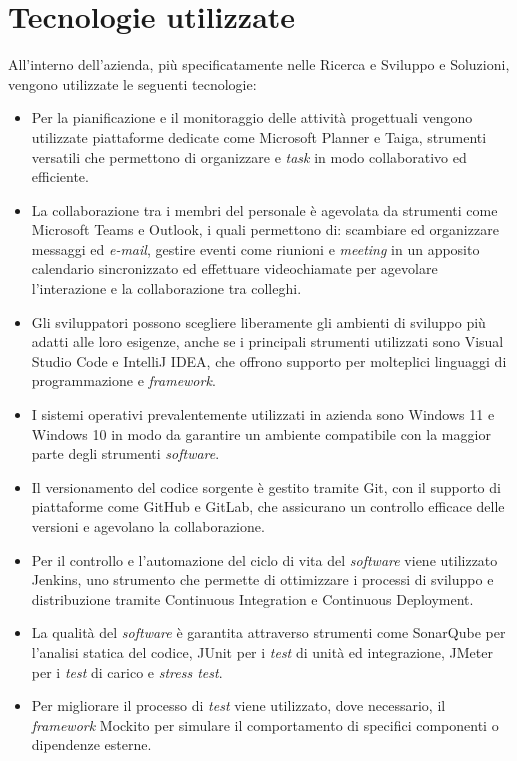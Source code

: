 \section{Tecnologie utilizzate}
All'interno dell'azienda, più specificatamente nelle  Ricerca e Sviluppo e Soluzioni, vengono utilizzate le seguenti tecnologie: 
\begin{itemize}
    \item Per la pianificazione e il monitoraggio delle attività progettuali vengono utilizzate piattaforme dedicate come Microsoft Planner e Taiga, strumenti versatili che permettono di organizzare  e \emph{task} in modo collaborativo ed efficiente. 
    \item La collaborazione tra i membri del personale è agevolata da strumenti come Microsoft Teams e Outlook, i quali permettono di: scambiare ed organizzare messaggi ed \emph{e-mail}, gestire eventi come riunioni e \emph{meeting} in un apposito calendario sincronizzato ed effettuare videochiamate per agevolare l'interazione e la collaborazione tra colleghi. 
    \item Gli sviluppatori possono scegliere liberamente gli ambienti di sviluppo più adatti alle loro esigenze, anche se i principali strumenti utilizzati sono Visual Studio Code e IntelliJ IDEA, che offrono supporto per molteplici linguaggi di programmazione e \emph{framework}. 
    \item I sistemi operativi prevalentemente utilizzati in azienda sono Windows 11 e Windows 10 in modo da garantire un ambiente compatibile con la maggior parte degli strumenti \emph{software}. 
    \item Il versionamento del codice sorgente è gestito tramite Git, con il supporto di piattaforme come GitHub e GitLab, che assicurano un controllo efficace delle versioni e agevolano la collaborazione. 
    \item Per il controllo e l'automazione del ciclo di vita del \emph{software} viene utilizzato Jenkins, uno strumento che permette di ottimizzare i processi di sviluppo e distribuzione tramite \gls{Continuous Integration} e \gls{Continuous Deployment}. 
    \item La qualità del \emph{software} è garantita attraverso strumenti come SonarQube per l'analisi statica del codice, JUnit per i \emph{test} di unità ed integrazione, JMeter per i \emph{test} di carico e \emph{stress test}. 
    \item Per migliorare il processo di \emph{test} viene utilizzato, dove necessario, il \emph{framework} Mockito per simulare il comportamento di specifici componenti o dipendenze esterne. 

\end{itemize}
